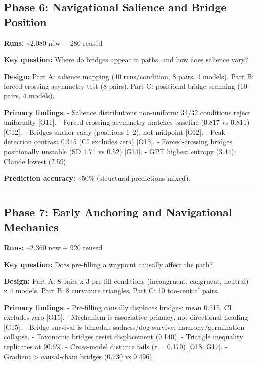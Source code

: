 \subsection{Phase 6: Navigational Salience and Bridge Position}\label{phase-6-navigational-salience-and-bridge-position}

\textbf{Runs:} \textasciitilde2,080 new + 280 reused

\textbf{Key question:} Where do bridges appear in paths, and how does salience vary?

\textbf{Design:} Part A: salience mapping (40 runs/condition, 8 pairs, 4 models). Part B: forced-crossing asymmetry test (8 pairs). Part C: positional bridge scanning (10 pairs, 4 models).

\textbf{Primary findings:} - Salience distributions non-uniform: 31/32 conditions reject uniformity {[}O11{]}. - Forced-crossing asymmetry matches baseline (0.817 vs 0.811) {[}G12{]}. - Bridges anchor early (positions 1--2), not midpoint {[}O12{]}. - Peak-detection contrast 0.345 (CI excludes zero) {[}O13{]}. - Forced-crossing bridges positionally unstable (SD 1.71 vs 0.52) {[}G14{]}. - GPT highest entropy (3.44); Claude lowest (2.59).

\textbf{Prediction accuracy:} \textasciitilde50\% (structural predictions mixed).

\begin{center}\rule{0.5\linewidth}{0.5pt}\end{center}

\subsection{Phase 7: Early Anchoring and Navigational Mechanics}\label{phase-7-early-anchoring-and-navigational-mechanics}

\textbf{Runs:} \textasciitilde2,360 new + 920 reused

\textbf{Key question:} Does pre-filling a waypoint causally affect the path?

\textbf{Design:} Part A: 8 pairs x 3 pre-fill conditions (incongruent, congruent, neutral) x 4 models. Part B: 8 curvature triangles. Part C: 10 too-central pairs.

\textbf{Primary findings:} - Pre-filling causally displaces bridges: mean 0.515, CI excludes zero {[}O15{]}. - Mechanism is associative primacy, not directional heading {[}G15{]}. - Bridge survival is bimodal: sadness/dog survive; harmony/germination collapse. - Taxonomic bridges resist displacement (0.140). - Triangle inequality replicates at 90.6\%. - Cross-model distance fails (r = 0.170) {[}O18, G17{]}. - Gradient \textgreater{} causal-chain bridges (0.730 vs 0.496).

